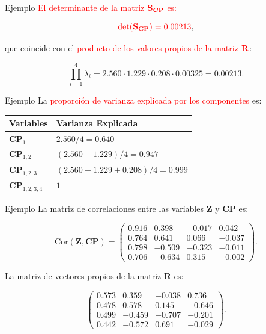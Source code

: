 \documentclass[
  ignorenonframetext,
]{beamer}
\begin{document}
\begin{frame}{Ejemplo}
\protect\hypertarget{ejemplo-25}{}
\textcolor{red}{El determinante de la matriz}
\(\textcolor{red}{\mathbf{S}_{\mathbf{CP}}}\) \textcolor{red}{ es:}

\[\textcolor{red}{\det(\mathbf{S}_{\mathbf{CP}})=0.00213},\]

que coincide con el \textcolor{red}{producto de los
valores propios de la matriz} \(\textcolor{red}{\mathbf{R}}\):

\[
\prod_{i=1}^4\lambda_i= 2.560\cdot 1.229\cdot 0.208\cdot 0.00325 = 0.00213.
\]
\end{frame}

\begin{frame}{Ejemplo}
\protect\hypertarget{ejemplo-26}{}
La \textcolor{red}{proporción de varianza explicada por los componentes}
es:

\begin{table}
\centering
\begin{tabular}{|l|l|}\hline
Variables&Varianza Explicada\\\hline
$\mathbf{CP}_1$&$2.560/4=0.640$\\\hline
$\mathbf{CP}_{1,2}$&$(2.560+1.229)/4=0.947$\\\hline
$\mathbf{CP}_{1,2,3}$&$(2.560+1.229+0.208)/4=0.999$\\\hline
$\mathbf{CP}_{1,2,3,4}$&$1$\\\hline
\end{tabular}
\end{table}
\end{frame}

\begin{frame}{Ejemplo}
\protect\hypertarget{ejemplo-27}{}
La matriz de correlaciones entre las variables \(\mathbf{Z}\) y
\(\mathbf{CP}\) es:

\[
\mbox{Cor}(\mathbf{Z},\mathbf{CP}) =
\begin{pmatrix}
0.916 & 0.398 & -0.017 & 0.042 \\
 0.764 & 0.641 & 0.066 & -0.037 \\
 0.798 & -0.509 & -0.323 & -0.011 \\
 0.706 & -0.634 & 0.315 & -0.002 
\end{pmatrix}.
\]

La matriz de vectores propios de la matriz \(\mathbf{ R}\) es:

\[
\begin{pmatrix}
0.573 & 0.359 & -0.038 & 0.736 \\
 0.478 & 0.578 & 0.145 & -0.646 \\
 0.499 & -0.459 & -0.707 & -0.201 \\
 0.442 & -0.572 & 0.691 & -0.029
\end{pmatrix}.
\]
\end{frame}
\end{document}
